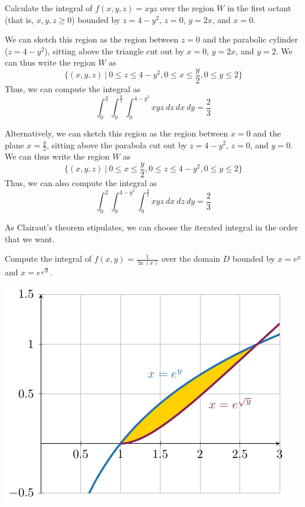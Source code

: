     \begin{example}
    Calculate the integral of $f(x,y,z) = xyz$ over the region $W$ in the first octant (that is, $x, y, z \geq 0$) bounded by $z = 4 - y^2$, $z = 0$, $y = 2x$, and $x= 0$.

    We can sketch this region as the region between $z=0$ and the parabolic cylinder ($z = 4 - y^2$), sitting above the triangle cut out by $x=0$, $y = 2x$, and $y=2$. We can thus write the region $W$ as 
    $$\{(x,y,z) \ | \ 0 \leq z \leq 4-y^2, 0 \leq x \leq \frac{y}{2}, 0 \leq y \leq 2\}$$
    Thus, we can compute the integral as $$\int_0^2\int_0^\frac{y}{2}\int_0^{4-y^2} xyz \ dz \ dx \ dy = \frac{2}{3}$$

    Alternatively, we can sketch this region as the region between $x=0$ and the plane $x = \frac{y}{2}$, sitting above the parabola cut out by $z = 4 - y^2$, $z=0$, and $y=0$.  We can thus write the region $W$ as 
    $$\{(x,y,z) \ | \ 0 \leq x \leq \frac{y}{2}, 0 \leq z \leq 4-y^2, 0 \leq y \leq 2\}$$
    Thus, we can also compute the integral as $$\int_0^2\int_0^{4-y^2}\int_0^\frac{y}{2} xyz \ dx \ dz \ dy = \frac{2}{3}$$

    As Clairaut's theorem stipulates, we can choose the iterated integral in the order that we want.
    \end{example}

    \begin{example}
        Compute the integral of $f(x,y) = \frac{1}{\ln(x)}$ over the domain $D$ bounded by $x = e^y$ and $x= e^{\sqrt{y}}$.

    \begin{center}
        \includegraphics{chapters/4-IntegrationRn/figures/figures-intersectfubini.pdf}
    \end{center}
        
    \end{example}

